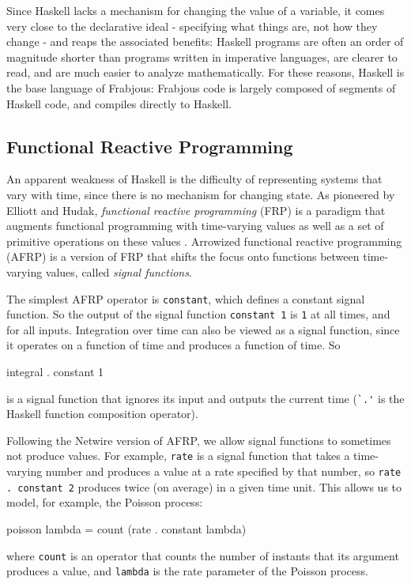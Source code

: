 \documentclass[oribibl]{llncs}
\begin{document}
  Since Haskell lacks a mechanism for changing the value of a variable, it comes very close to the declarative ideal - specifying what things are, not how they change - and reaps the associated benefits: Haskell programs are often an order of magnitude shorter than programs written in imperative languages, are clearer to read, and are much easier to analyze mathematically. For these reasons, Haskell is the base language of Frabjous: Frabjous code is largely composed of segments of Haskell code, and compiles directly to Haskell.
  
\subsection{Functional Reactive Programming}
\label{frp}
  An apparent weakness of Haskell is the difficulty of representing systems that vary with time, since there is no mechanism for changing state.  As pioneered by Elliott and Hudak, \emph{functional reactive programming} (FRP) is a paradigm that augments functional programming with time-varying values as well as a set of primitive operations on these values \cite{fran}. Arrowized functional reactive programming (AFRP) is a version of FRP that shifts the focus onto functions between time-varying values, called \emph{signal functions}\cite{frpcont}. 
  
  The simplest AFRP operator is \lstinline{constant}, which defines a constant signal function. So the output of the signal function \lstinline{constant 1} is \lstinline{1} at all times, and for all inputs. 
  Integration over time can also be viewed as a signal function, since it operates on a function of time and produces a function of time. So
\begin{code}
	integral . constant 1
\end{code}
is a signal function that ignores its input and outputs the current time (\lstinline{`.'} is the Haskell function composition operator). 

  Following the Netwire version of AFRP\cite{netwire}, we allow signal functions to sometimes not produce values. For example, \lstinline{rate} is a signal function that takes a time-varying number and produces a value at a rate specified by that number, so \lstinline{rate . constant 2} produces twice (on average) in a given time unit. This allows us to model, for example, the Poisson process: 
\begin{code}
	poisson lambda = count (rate . constant lambda)
\end{code}
where \lstinline{count} is an operator that counts the number of instants that its argument produces a value, and \lstinline{lambda} is the rate parameter of the Poisson process. 
\end{document}
